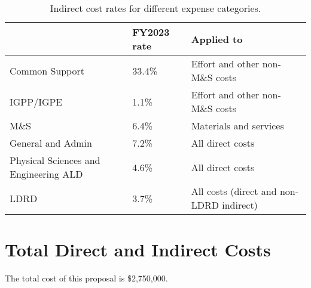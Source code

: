 \documentclass[letter, USenglish, 11pt, subfigure]{article}
\begin{document}
\begin{table}[!htpb]
  \begin{center}  
    \caption{Indirect cost rates for different expense categories.}
    \label{tab:indirectRates}
    \begin{tabular}{lll}
      \hline
      {} & FY2023 rate & Applied to  \\
      \hline
      Common Support & 33.4\% & Effort and other non-M\&S costs\\
      IGPP/IGPE & 1.1\% &  Effort and other non-M\&S costs \\
      M\&S & 6.4\% & Materials and services\\
      General and Admin & 7.2\% & All direct costs\\
      Physical Sciences and Engineering ALD & 4.6\% & All direct costs\\
      LDRD & 3.7\% & All costs (direct and non-LDRD indirect)\\
      \hline
    \end{tabular}
  \end{center}
\end{table}


\section{Total Direct and Indirect Costs}
\label{subsec:totalCosts}
The total cost of this proposal is \$2,750,000. 


\clearpage

%
\end{document}
